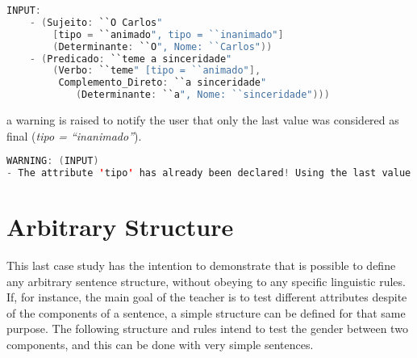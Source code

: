 \begin{center}
\begin{minipage}{14cm}
\begin{lstlisting}[language=java, basicstyle=\small, label={lst:meta_input_attr_twice}, caption=Example of the students parsing with the same attribute in a single component]
INPUT:
    - (Sujeito: ``O Carlos" 
        [tipo = ``animado", tipo = ``inanimado"]
        (Determinante: ``O", Nome: ``Carlos"))
    - (Predicado: ``teme a sinceridade" 
        (Verbo: ``teme" [tipo = ``animado"], 
         Complemento_Direto: ``a sinceridade" 
            (Determinante: ``a", Nome: ``sinceridade")))
\end{lstlisting}
\end{minipage}
\end{center}

\noindent a warning is raised to notify the user that only the last value was considered as final (\emph{tipo = ``inanimado''}).

\begin{center}
\begin{minipage}{14cm}
\begin{lstlisting}[language=java, basicstyle=\small, label={lst:meta_input_missing_attr_warn}, caption=Example warning message of same attribute in a single component]
WARNING: (INPUT) 
- The attribute 'tipo' has already been declared! Using the last value found.
\end{lstlisting}
\end{minipage}
\end{center}

\section{Arbitrary Structure}

This last case study has the intention to demonstrate that is possible to define any arbitrary sentence structure, without obeying to any specific linguistic rules. If, for instance, the main goal of the teacher is to test
different attributes despite of the components of a sentence, a simple structure can be defined for that same purpose. The following structure and rules intend to test the gender between two components, and this can be done 
with very simple sentences.

